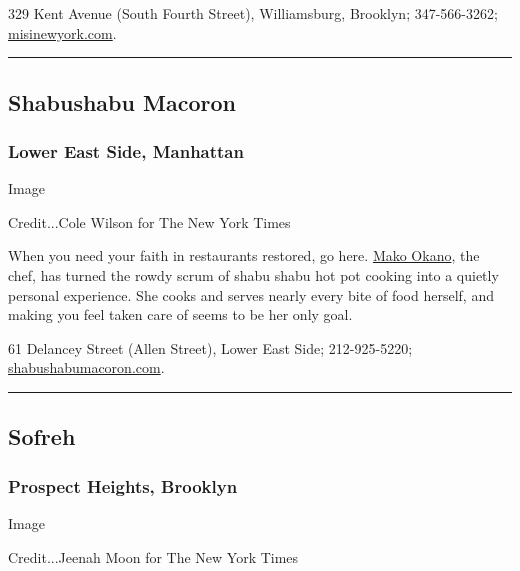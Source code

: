 329 Kent Avenue (South Fourth Street), Williamsburg, Brooklyn;
347-566-3262; \href{https://www.misinewyork.com/}{misinewyork.com}.

\begin{center}\rule{0.5\linewidth}{\linethickness}\end{center}

\hypertarget{shabushabu-macoron}{%
\subsection{Shabushabu Macoron}\label{shabushabu-macoron}}

\hypertarget{lower-east-side-manhattan}{%
\subsubsection{Lower East Side,
Manhattan}\label{lower-east-side-manhattan}}

Image

Credit...Cole Wilson for The New York Times

When you need your faith in restaurants restored, go here.
\href{https://www.nytimes3xbfgragh.onion/slideshow/2018/06/12/dining/shabushabu-macoron-nyc/s/13rest-ss1.html}{Mako
Okano}, the chef, has turned the rowdy scrum of shabu shabu hot pot
cooking into a quietly personal experience. She cooks and serves nearly
every bite of food herself, and making you feel taken care of seems to
be her only goal.

61 Delancey Street (Allen Street), Lower East Side; 212-925-5220;
\href{https://www.shabushabumacoron.com/}{shabushabumacoron.com}.

\begin{center}\rule{0.5\linewidth}{\linethickness}\end{center}

\hypertarget{sofreh}{%
\subsection{Sofreh}\label{sofreh}}

\hypertarget{prospect-heights-brooklyn}{%
\subsubsection{Prospect Heights,
Brooklyn}\label{prospect-heights-brooklyn}}

Image

Credit...Jeenah Moon for The New York Times

